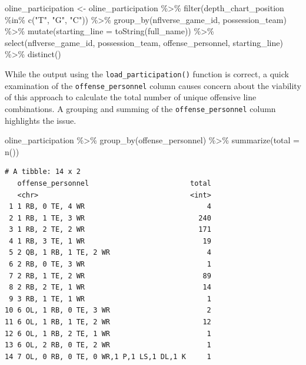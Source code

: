 \documentclass[
  letterpaper,
]{krantz}
\newenvironment{Shaded}{\begin{snugshade}}{\end{snugshade}}
\newcommand{\AttributeTok}[1]{\textcolor[rgb]{0.40,0.45,0.13}{#1}}
\newcommand{\FunctionTok}[1]{\textcolor[rgb]{0.28,0.35,0.67}{#1}}
\newcommand{\NormalTok}[1]{\textcolor[rgb]{0.00,0.23,0.31}{#1}}
\newcommand{\OtherTok}[1]{\textcolor[rgb]{0.00,0.23,0.31}{#1}}
\newcommand{\SpecialCharTok}[1]{\textcolor[rgb]{0.37,0.37,0.37}{#1}}
\newcommand{\StringTok}[1]{\textcolor[rgb]{0.13,0.47,0.30}{#1}}
\begin{document}
\begin{Shaded}
\begin{Highlighting}[]
\NormalTok{oline\_participation }\OtherTok{\textless{}{-}}\NormalTok{ oline\_participation }\SpecialCharTok{\%\textgreater{}\%}
  \FunctionTok{filter}\NormalTok{(depth\_chart\_position }\SpecialCharTok{\%in\%} \FunctionTok{c}\NormalTok{(}\StringTok{"T"}\NormalTok{, }\StringTok{"G"}\NormalTok{, }\StringTok{"C"}\NormalTok{)) }\SpecialCharTok{\%\textgreater{}\%}
  \FunctionTok{group\_by}\NormalTok{(nflverse\_game\_id, possession\_team) }\SpecialCharTok{\%\textgreater{}\%}
  \FunctionTok{mutate}\NormalTok{(}\AttributeTok{starting\_line =} \FunctionTok{toString}\NormalTok{(full\_name)) }\SpecialCharTok{\%\textgreater{}\%}
  \FunctionTok{select}\NormalTok{(nflverse\_game\_id, possession\_team, }
\NormalTok{         offense\_personnel, starting\_line) }\SpecialCharTok{\%\textgreater{}\%}
  \FunctionTok{distinct}\NormalTok{()}
\end{Highlighting}
\end{Shaded}

While the output using the \texttt{load\_participation()} function is
correct, a quick examination of the \texttt{offense\_personnel} column
causes concern about the viability of this approach to calculate the
total number of unique offensive line combinations. A grouping and
summing of the \texttt{offense\_personnel} column highlights the issue.

\begin{Shaded}
\begin{Highlighting}[]
\NormalTok{oline\_participation }\SpecialCharTok{\%\textgreater{}\%}
  \FunctionTok{group\_by}\NormalTok{(offense\_personnel) }\SpecialCharTok{\%\textgreater{}\%}
  \FunctionTok{summarize}\NormalTok{(}\AttributeTok{total =} \FunctionTok{n}\NormalTok{())}
\end{Highlighting}
\end{Shaded}

\begin{verbatim}
# A tibble: 14 x 2
   offense_personnel                        total
   <chr>                                    <int>
 1 1 RB, 0 TE, 4 WR                             4
 2 1 RB, 1 TE, 3 WR                           240
 3 1 RB, 2 TE, 2 WR                           171
 4 1 RB, 3 TE, 1 WR                            19
 5 2 QB, 1 RB, 1 TE, 2 WR                       4
 6 2 RB, 0 TE, 3 WR                             1
 7 2 RB, 1 TE, 2 WR                            89
 8 2 RB, 2 TE, 1 WR                            14
 9 3 RB, 1 TE, 1 WR                             1
10 6 OL, 1 RB, 0 TE, 3 WR                       2
11 6 OL, 1 RB, 1 TE, 2 WR                      12
12 6 OL, 1 RB, 2 TE, 1 WR                       1
13 6 OL, 2 RB, 0 TE, 2 WR                       1
14 7 OL, 0 RB, 0 TE, 0 WR,1 P,1 LS,1 DL,1 K     1
\end{verbatim}
\end{document}
